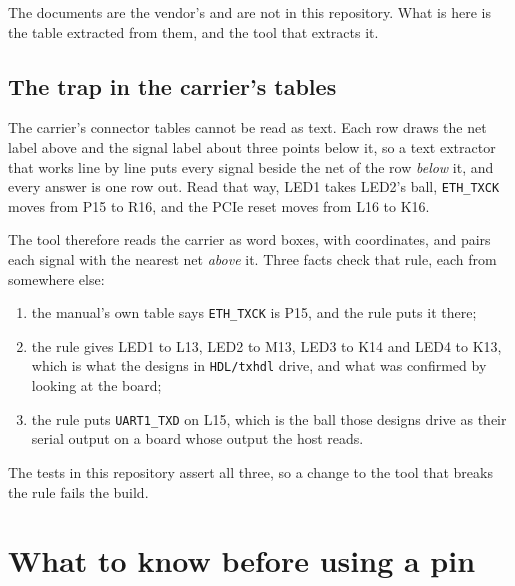 \documentclass[10pt,a4paper]{article}
\begin{document}
The documents are the vendor's and are not in this repository. What is
here is the table extracted from them, and the tool that extracts it.

\subsection{The trap in the carrier's tables}

The carrier's connector tables cannot be read as text. Each row draws
the net label above and the signal label about three points below it, so
a text extractor that works line by line puts every signal beside the
net of the row \emph{below} it, and every answer is one row out. Read
that way, LED1 takes LED2's ball, \texttt{ETH\_TXCK} moves from P15 to
R16, and the PCIe reset moves from L16 to K16.

The tool therefore reads the carrier as word boxes, with coordinates,
and pairs each signal with the nearest net \emph{above} it. Three facts
check that rule, each from somewhere else:

\begin{enumerate}
  \item the manual's own table says \texttt{ETH\_TXCK} is P15, and the
    rule puts it there;
  \item the rule gives LED1 to L13, LED2 to M13, LED3 to K14 and LED4 to
    K13, which is what the designs in \texttt{HDL/txhdl} drive, and what
    was confirmed by looking at the board;
  \item the rule puts \texttt{UART1\_TXD} on L15, which is the ball
    those designs drive as their serial output on a board whose output
    the host reads.
\end{enumerate}

The tests in this repository assert all three, so a change to the tool
that breaks the rule fails the build.

\section{What to know before using a pin}
\end{document}
